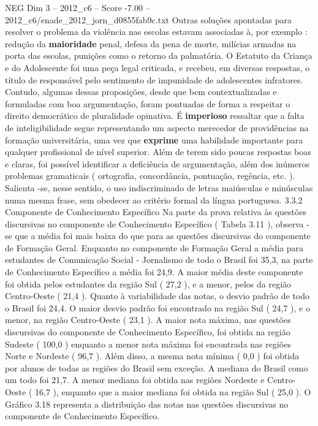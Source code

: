 \begin{textsample}{NEG Dim 3 – 2012\_c6 – Score -7.00 – 2012\_c6/enade\_2012\_jorn\_d0855fab9c.txt}
Outras soluções apontadas para resolver o problema da violência nas escolas estavam associadas à, por exemplo : redução da \textbf{maioridade} penal, defesa da pena de morte, milícias armadas na porta das escolas, punições como o retorno da palmatória.
O Estatuto da Criança e do Adolescente foi uma peça legal criticada, e recebeu, em diversas respostas, o título de responsável pelo sentimento de impunidade de adolescentes infratores.
Contudo, algumas dessas proposições, desde que bem contextualizadas e formuladas com boa argumentação, foram pontuadas de forma a respeitar o direito democrático de pluralidade opinativa.
É \textbf{imperioso} ressaltar que a falta de inteligibilidade segue representando um aspecto merecedor de providências na formação universitária, uma vez que \textbf{exprime} uma habilidade importante para qualquer profissional de nível superior.
Além de terem sido poucas respostas boas e claras, foi possível identificar a deficiência de argumentação, além dos inúmeros problemas gramaticais ( ortografia, concordância, pontuação, regência, etc. ).
Salienta -se, nesse sentido, o uso indiscriminado de letras maiúsculas e minúsculas numa mesma frase, sem obedecer ao critério formal da língua portuguesa. 3.3.2 Componente de Conhecimento Específico Na parte da prova relativa às questões discursivas no componente de Conhecimento Específico ( Tabela 3.11 ), observa -se que a média foi mais baixa do que para as questões discursivas do componente de Formação Geral.
Enquanto no componente de Formação Geral a média para estudantes de Comunicação Social - Jornalismo de todo o Brasil foi 35,3, na parte de Conhecimento Específico a média foi 24,9.
A maior média deste componente foi obtida pelos estudantes da região Sul ( 27,2 ), e a menor, pelos da região Centro-Oeste ( 21,4 ).
Quanto à variabilidade das notas, o desvio padrão de todo o Brasil foi 24,4.
O maior desvio padrão foi encontrado na região Sul ( 24,7 ), e o menor, na região Centro-Oeste ( 23,1 ).
A maior nota máxima, nas questões discursivas do componente de Conhecimento Específico, foi obtida na região Sudeste ( 100,0 ) enquanto a menor nota máxima foi encontrada nas regiões Norte e Nordeste ( 96,7 ).
Além disso, a mesma nota mínima ( 0,0 ) foi obtida por alunos de todas as regiões do Brasil sem exceção.
A mediana do Brasil como um todo foi 21,7.
A menor mediana foi obtida nas regiões Nordeste e Centro-Oeste ( 16,7 ), enquanto que a maior mediana foi obtida na região Sul ( 25,0 ).
O Gráfico 3.18 representa a distribuição das notas nas questões discursivas no componente de Conhecimento Específico.

\end{textsample}
